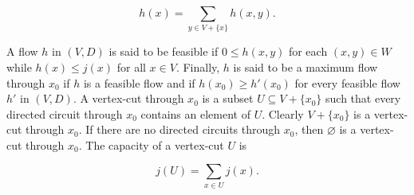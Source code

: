 $$h(x) = \sum_{y \in V + \{x\}} h(x,y).$$

A flow $h$ in $(V, D)$ is said to be feasible if $0 \leq h(x, y)$ for each $(x, y) \in W$ while $h(x) \leq j(x)$ for all $x \in V$. Finally, $h$ is said to be a maximum flow through $x_0$ if $h$ is a feasible flow and if $h(x_0) \geq h'(x_0)$ for every feasible flow $h'$ in $(V, D)$. A vertex-cut through $x_0$ is a subset $U \subseteq V + \{x_0\}$ such that every directed circuit through $x_0$ contains an element of $U$. Clearly $V + \{x_0\}$ is a vertex-cut through $x_0$. If there are no directed circuits through $x_0$, then $\varnothing$ is a vertex-cut through $x_0$. The capacity of a vertex-cut $U$ is

$$j(U) = \sum_{x \in U} j(x).$$
